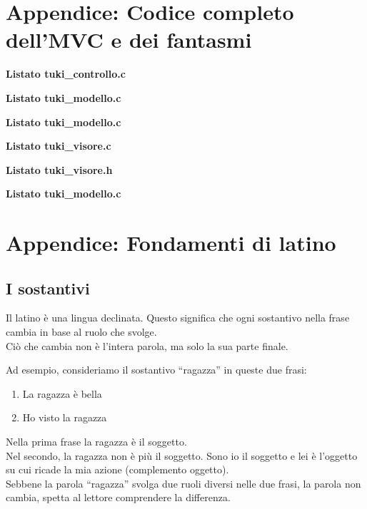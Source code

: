 \documentclass[8pt]{book}
\begin{document}
\chapter[Codice MVC e fantasmi]{Appendice: Codice completo dell'MVC e dei fantasmi}

\textbf{Listato tuki\_controllo.c}


\textbf{Listato tuki\_modello.c}


\textbf{Listato tuki\_modello.c}


\textbf{Listato tuki\_visore.c}


\textbf{Listato tuki\_visore.h}


\textbf{Listato tuki\_modello.c}


\chapter[Fondamenti di latino]{Appendice: Fondamenti di latino}

\section{I sostantivi}

Il latino è una lingua declinata. Questo significa che ogni sostantivo nella frase cambia in base al ruolo che svolge.\\
Ciò che cambia non è l'intera parola, ma solo la sua parte finale.

Ad esempio, consideriamo il sostantivo ``ragazza'' in queste due frasi:

\begin{enumerate}
\item
  La ragazza è bella
\item
  Ho visto la ragazza
\end{enumerate}

Nella prima frase la ragazza è il soggetto.\\
Nel secondo, la ragazza non è più il soggetto. Sono io il soggetto e lei è l'oggetto su cui ricade la mia azione (complemento oggetto).\\
Sebbene la parola ``ragazza'' svolga due ruoli diversi nelle due frasi, la parola non cambia, spetta al lettore comprendere la differenza.\\
\end{document}
